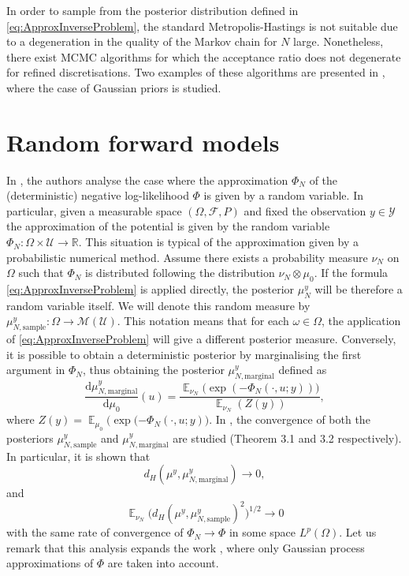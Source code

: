 \documentclass{article}
\theoremstyle{remark}
\theoremstyle{definition}
\newcommand{\R}{\mathbb{R}}
\newcommand{\E}{\operatorname{\mathbb{E}}}
\newcommand{\dd}{\mathrm{d}}
\newcommand{\ml}{\mathcal}
\begin{document}
In order to sample from the posterior distribution defined in \eqref{eq:ApproxInverseProblem}, the standard Metropolis-Hastings is not suitable due to a degeneration in the quality of the Markov chain for $N$ large. Nonetheless, there exist MCMC algorithms for which the acceptance ratio does not degenerate for refined discretisations. Two examples of these algorithms are presented in \cite{CRS13, RuS16}, where the case of Gaussian priors is studied.

\section*{Random forward models}
In \cite{LST17}, the authors analyse the case where the approximation $\Phi_N$ of the (deterministic) negative log-likelihood $\Phi$ is given by a random variable. In particular, given a measurable space $(\Omega, \ml F, P)$ and fixed the observation $y \in \ml Y$ the approximation of the potential is given by the random variable $\Phi_N \colon \Omega \times \ml U \to \R$. This situation is typical of the approximation given by a probabilistic numerical method. Assume there exists a probability measure $\nu_N$ on $\Omega$ such that $\Phi_N$ is distributed following the distribution $\nu_N \otimes \mu_0$. If the formula \eqref{eq:ApproxInverseProblem} is applied directly, the posterior $\mu_N^y$ will be therefore a random variable itself. We will denote this random measure by $\mu_{N, \mathrm{sample}}^y \colon \Omega \to \ml M(\ml U)$. This notation means that for each $\omega \in \Omega$, the application of \eqref{eq:ApproxInverseProblem} will give a different posterior measure. Conversely, it is possible to obtain a deterministic posterior by marginalising the first argument in $\Phi_N$, thus obtaining the posterior $\mu_{N, \mathrm{marginal}}^y$ defined as
\begin{equation*}
	\frac{\dd \mu_{N, \mathrm{marginal}}^y}{\dd \mu_0} (u) = \frac{\E_{\nu_N}\big(\exp (-\Phi_N(\cdot, u; y))\big)}{\E_{\nu_N} (Z(y))} ,
\end{equation*}
where $Z(y) = \E_{\mu_0}\big(\exp (-\Phi_N(\cdot, u; y)\big)$. In \cite{LST17}, the convergence of both the posteriors $\mu_{N, \mathrm{sample}}^y$ and $\mu_{N, \mathrm{marginal}}^y$ are studied (Theorem 3.1 and 3.2 respectively). In particular, it is shown that 
\[
d_H(\mu^y, \mu_{N, \mathrm{marginal}}^y) \to 0,
\] 
and 
\[
\E_{\nu_N}\big(d_H(\mu^y, \mu_{N, \mathrm{sample}}^y)^2\big)^{1/2} \to 0
\]
with the same rate of convergence of $\Phi_N \to \Phi$ in some space $L^p(\Omega)$. Let us remark that this analysis expands the work \cite{StT18}, where only Gaussian process approximations of $\Phi$ are taken into account.
\end{document}
